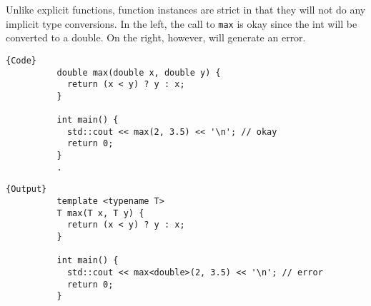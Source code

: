 \documentclass{article}
\begin{document}
    \begin{lemma}
      Unlike explicit functions, function instances are strict in that they will not do any implicit type conversions. In the left, the call to \texttt{max} is okay since the int will be converted to a double. On the right, however, will generate an error. 

      \noindent\begin{minipage}{.5\textwidth}
        \begin{lstlisting}[]{Code}
          double max(double x, double y) {
            return (x < y) ? y : x;
          }

          int main() {
            std::cout << max(2, 3.5) << '\n'; // okay
            return 0;
          }
          .
        \end{lstlisting}
        \end{minipage}
        \hfill
        \begin{minipage}{.49\textwidth}
        \begin{lstlisting}[]{Output}
          template <typename T>
          T max(T x, T y) {
            return (x < y) ? y : x;
          }

          int main() {
            std::cout << max<double>(2, 3.5) << '\n'; // error
            return 0;
          }
        \end{lstlisting}
      \end{minipage}
    \end{lemma} 

    \begin{definition}
      
    \end{definition}

    \begin{definition}
      
    \end{definition}
\end{document}

